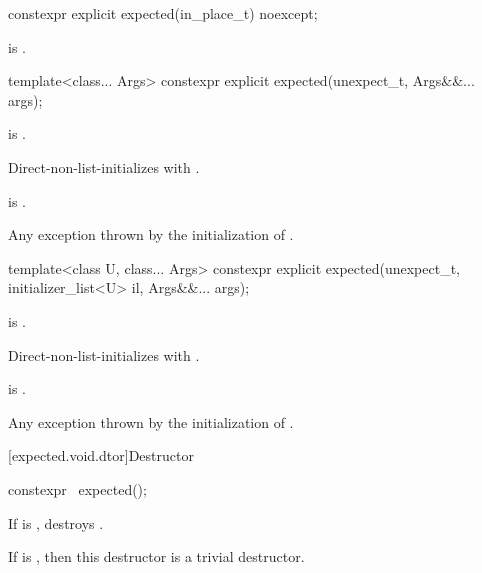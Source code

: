 %
\begin{itemdecl}
constexpr explicit expected(in_place_t) noexcept;
\end{itemdecl}

\begin{itemdescr}
\pnum
\ensures
{} is .
\end{itemdescr}

%
\begin{itemdecl}
template<class... Args>
  constexpr explicit expected(unexpect_t, Args&&... args);
\end{itemdecl}

\begin{itemdescr}
\pnum
\constraints
{} is .

\pnum
\effects
Direct-non-list-initializes 
with .

\pnum
\ensures
{} is .

\pnum
\throws
Any exception thrown by the initialization of .
\end{itemdescr}

%
\begin{itemdecl}
template<class U, class... Args>
  constexpr explicit expected(unexpect_t, initializer_list<U> il, Args&&... args);
\end{itemdecl}

\begin{itemdescr}
\pnum
\constraints
{} is .

\pnum
\effects
Direct-non-list-initializes 
with .

\pnum
\ensures
{} is .

\pnum
\throws
Any exception thrown by the initialization of .
\end{itemdescr}

[expected.void.dtor]{Destructor}

%
\begin{itemdecl}
constexpr ~expected();
\end{itemdecl}

\begin{itemdescr}
\pnum
\effects
If  is , destroys .

\pnum
\remarks
If  is ,
then this destructor is a trivial destructor.
\end{itemdescr}

